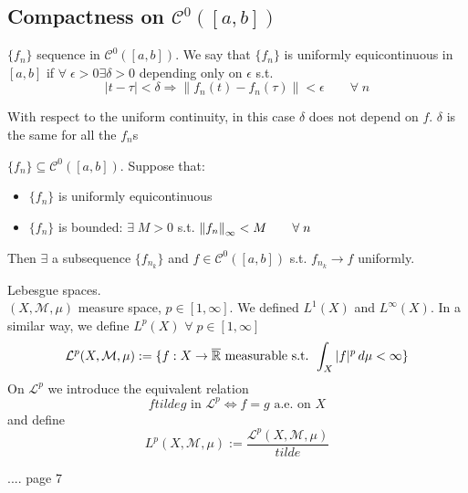 \subsection*{Compactness on \(\mathcal{C}^0(\left[a, b\right])\)}
\begin{definition}
    \(\{f_n\}\) sequence in \(\mathcal{C}^0(\left[a, b\right])\). We say that \(\{f_n\}\) is uniformly equicontinuous in \([a, b]\) if \(\forall \; \epsilon >0 \exists \delta >0 \) depending only on \(\epsilon \) s.t. 
    \[
        |t-\tau| < \delta \Rightarrow \| f_n(t) - f_n(\tau) \| < \epsilon \qquad \forall \; n
    \]
\end{definition}

\begin{remark}
    With respect to the uniform continuity, in this case \(\delta\) does not depend on \(f\). \(\delta\) is the same for all the \(f_n\)s
\end{remark}

\begin{theorem}
    \(\{f_n\} \subseteq \mathcal{C}^0(\left[a, b\right])\). Suppose that:
    \begin{itemize}
        \item \(\{f_n\}\) is uniformly equicontinuous
        \item \(\{f_n\}\) is bounded: \(\exists \; M>0\) s.t. \(\norm{f_n}_\infty <M \qquad \forall \; n\)
    \end{itemize}
    Then \(\exists\) a subsequence \(\{f_{n_k}\}\) and \(f \in \mathcal{C}^0(\left[a, b\right])\) s.t. \(f_{n_k} \rightarrow f \) uniformly.
\end{theorem}

Lebesgue spaces. \\
\((X, \mathcal{M}, \mu)\) measure space, \(p \in \left[1, \infty\right]\). We defined \(L^1(X)\) and \(L^\infty(X)\). In a similar way, we define \(L^p(X)\) \(\forall \; p \in \left[1, \infty\right]\)
\[
    \mathcal{L}^p (X, \mathcal{M}, \mu) := \{ f: X \rightarrow \overline{\mathbb{R}} \text{ measurable s.t. } \int_X |f|^p \, d\mu < \infty\}
\]
On \(\mathcal{L}^p\) we introduce the equivalent relation
\[
    f tilde g \text{ in } \mathcal{L}^p \iff f=g \text{ a.e. on } X 
\]
and define 
\[
    {L}^p (X, \mathcal{M}, \mu) := \frac{\mathcal{L}^p (X, \mathcal{M}, \mu)}{tilde}
\]



.... page 7